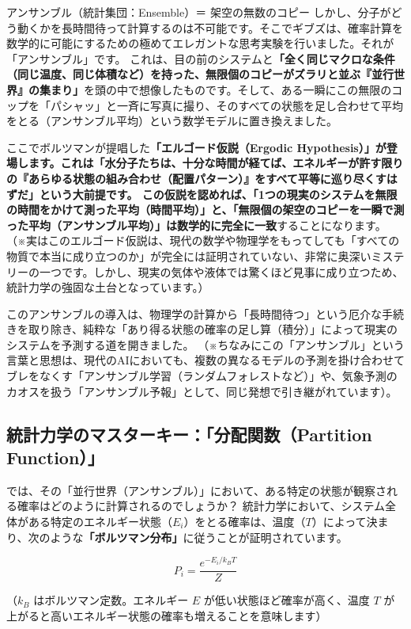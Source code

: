 アンサンブル（統計集団：Ensemble）＝ 架空の無数のコピー しかし、分子がどう動くかを長時間待って計算するのは不可能です。そこでギブズは、確率計算を数学的に可能にするための極めてエレガントな思考実験を行いました。それが「アンサンブル」です。 これは、目の前のシステムと\textbf{「全く同じマクロな条件（同じ温度、同じ体積など）を持った、無限個のコピーがズラリと並ぶ『並行世界』の集まり」}を頭の中で想像したものです。そして、ある一瞬にこの無限のコップを「パシャッ」と一斉に写真に撮り、そのすべての状態を足し合わせて平均をとる（アンサンブル平均）という数学モデルに置き換えました。

ここでボルツマンが提唱した\textbf{「エルゴード仮説（Ergodic Hypothesis）」が登場します。これは「水分子たちは、十分な時間が経てば、エネルギーが許す限りの『あらゆる状態の組み合わせ（配置パターン）』をすべて平等に巡り尽くすはずだ」という大前提です。 この仮説を認めれば、「1つの現実のシステムを無限の時間をかけて測った平均（時間平均）」と、「無限個の架空のコピーを一瞬で測った平均（アンサンブル平均）」は数学的に完全に一致}することになります。 （※実はこのエルゴード仮説は、現代の数学や物理学をもってしても「すべての物質で本当に成り立つのか」が完全には証明されていない、非常に奥深いミステリーの一つです。しかし、現実の気体や液体では驚くほど見事に成り立つため、統計力学の強固な土台となっています。）

このアンサンブルの導入は、物理学の計算から「長時間待つ」という厄介な手続きを取り除き、純粋な「あり得る状態の確率の足し算（積分）」によって現実のシステムを予測する道を開きました。 （※ちなみにこの「アンサンブル」という言葉と思想は、現代のAIにおいても、複数の異なるモデルの予測を掛け合わせてブレをなくす「アンサンブル学習（ランダムフォレストなど）」や、気象予測のカオスを扱う「アンサンブル予報」として、同じ発想で引き継がれています）。

\subsection{統計力学のマスターキー：「分配関数（Partition Function）」}

では、その「並行世界（アンサンブル）」において、ある特定の状態が観察される確率はどのように計算されるのでしょうか？ 統計力学において、システム全体がある特定のエネルギー状態（\(E_i\)）をとる確率は、温度（\(T\)）によって決まり、次のような\textbf{「ボルツマン分布」}に従うことが証明されています。

\[
P_i = \frac{e^{-E_i/k_B T}}{Z}
\]

（\(k_B\) はボルツマン定数。エネルギー \(E\) が低い状態ほど確率が高く、温度 \(T\) が上がると高いエネルギー状態の確率も増えることを意味します）

